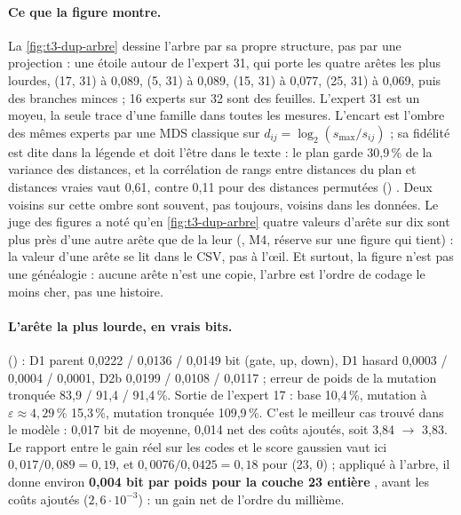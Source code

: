 \paragraph{Ce que la figure montre.} La \cref{fig:t3-dup-arbre} dessine l'arbre par sa propre structure, pas par une projection : une étoile autour de l'expert 31, qui porte les quatre arêtes les plus lourdes, (17, 31) à 0,089, (5, 31) à 0,089, (15, 31) à 0,077, (25, 31) à 0,069, puis des branches minces ; 16 experts sur 32 sont des feuilles. L'expert 31 est un moyeu, la seule trace d'une famille dans toutes les mesures. L'encart est l'ombre des mêmes experts par une MDS classique sur $d_{ij} = \log_2(s_{\max}/s_{ij})$ ; sa fidélité est dite dans la légende et doit l'être dans le texte : le plan garde 30,9\,\% de la variance des distances, et la corrélation de rangs entre distances du plan et distances vraies vaut 0,61, contre 0,11 pour des distances permutées () \mes. Deux voisins sur cette ombre sont souvent, pas toujours, voisins dans les données. Le juge des figures a noté qu'en \cref{fig:t3-dup-arbre} quatre valeurs d'arête sur dix sont plus près d'une autre arête que de la leur (, M4, réserve sur une figure qui tient) : la valeur d'une arête se lit dans le CSV, pas à l'œil. Et surtout, la figure n'est pas une généalogie : aucune arête n'est une copie, l'arbre est l'ordre de codage le moins cher, pas une histoire.

\paragraph{L'arête la plus lourde, en vrais bits.}  () \mes : D1 parent 0,0222 / 0,0136 / 0,0149 bit (gate, up, down), D1 hasard 0,0003 / 0,0004 / 0,0001, D2b 0,0199 / 0,0108 / 0,0117 ; erreur de poids de la mutation tronquée 83,9 / 91,4 / 91,4\,\%. Sortie de l'expert 17 : base 10,4\,\%, mutation à $\varepsilon \approx 4{,}29\,\%$ 15,3\,\%, mutation tronquée 109,9\,\%. C'est le meilleur cas trouvé dans le modèle : 0,017 bit de moyenne, 0,014 net des coûts ajoutés, soit 3,84 $\to$ 3,83. Le rapport entre le gain réel sur les codes et le score gaussien vaut ici $0{,}017/0{,}089 = 0{,}19$, et $0{,}0076/0{,}0425 = 0{,}18$ pour (23, 0) ; appliqué à l'arbre, il donne environ \textbf{0,004 bit par poids pour la couche 23 entière} \calc, avant les coûts ajoutés ($2{,}6\cdot10^{-3}$) : un gain net de l'ordre du millième.


